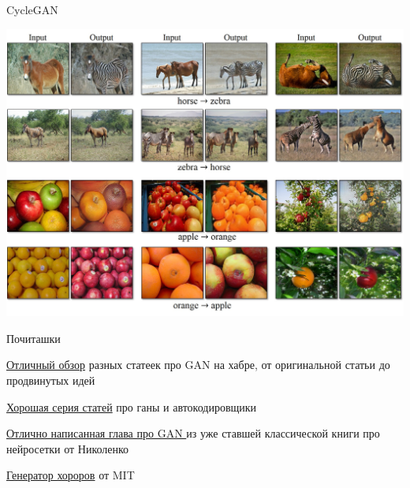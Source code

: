 \documentclass[notes,12pt, aspectratio=169]{beamer}
\newenvironment{wideitemize}{\itemize\addtolength{\itemsep}{10pt}}{\enditemize}
\begin{document}
\begin{frame}{CycleGAN}
\begin{center}
	\includegraphics[width=.7\linewidth]{cycle_gan.jpg}
\end{center}
\end{frame}

\begin{frame}{Почиташки}
\begin{wideitemize}
	\item   {\color{blue}  \href{https://habr.com/ru/company/ods/blog/322514/}{Отличный обзор} }  разных статеек про GAN на хабре, от оригинальной статьи до продвинутых идей 
	
	\item   {\color{blue}  \href{https://habr.com/ru/post/331382/}{{Хорошая серия статей}}} про ганы и автокодировщики 
	
	\item    {\color{blue}  \href{https://drive.google.com/file/d/1TLgtJYIs7hmDwrjbqhCjCrVmGUbc6orI/view}{Отлично написанная глава про GAN }} из уже ставшей классической книги про нейросетки от Николенко 
		
	\item   {\color{blue}  \href{http://nightmare.mit.edu/}{{Генератор хороров}}} от MIT
\end{wideitemize}
\end{frame}
\end{document}

